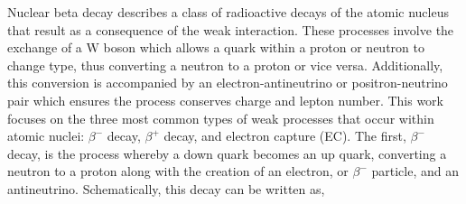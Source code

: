 \documentclass[thesis.tex]{subfiles}
\begin{document}
Nuclear beta decay describes a class of radioactive decays of the atomic nucleus that result as a consequence of the weak interaction.  These processes involve the exchange of a $\mathrm{W}$ boson which allows a quark within a proton or neutron to change type, thus converting a neutron to a proton or vice versa.  Additionally, this conversion is accompanied by an electron-antineutrino or positron-neutrino pair which ensures the process conserves charge and lepton number.  This work focuses on the three most common types of weak processes that occur within atomic nuclei: $\beta^{-}$ decay, $\beta^{+}$ decay, and electron capture (EC).  The first, $\beta^{-}$ decay, is the process whereby a down quark becomes an up quark, converting a neutron to a proton along with the creation of an electron, or $\beta^{-}$ particle, and an antineutrino.  Schematically, this decay can be written as,
\end{document}
